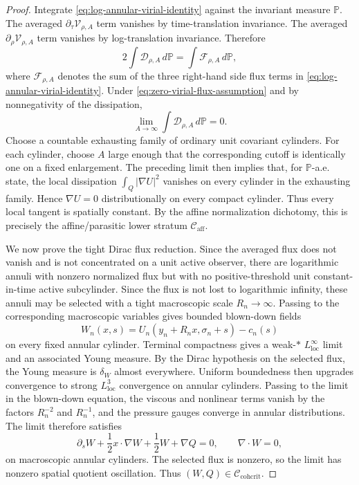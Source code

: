 \documentclass[11pt]{amsart}
\numberwithin{equation}{section}
\theoremstyle{plain}
\theoremstyle{definition}
\theoremstyle{remark}
\newcommand{\loc}{\mathrm{loc}}
\newcommand{\Caff}{\mathcal C_{\mathrm{aff}}}
\newcommand{\Ccohcrit}{\mathcal C_{\mathrm{cohcrit}}}
\begin{document}
\begin{proof}
Integrate \eqref{eq:log-annular-virial-identity} against the invariant measure
\(\mathbb P\).  The averaged \(\partial_\tau\mathcal V_{\rho,A}\) term
vanishes by time-translation invariance.  The averaged
\(\partial_\rho\mathcal V_{\rho,A}\) term vanishes by log-translation
invariance.  Therefore
\[
   2\int \mathcal D_{\rho,A}\,d\mathbb P
   =
   \int \mathcal F_{\rho,A}\,d\mathbb P,
\]
where \(\mathcal F_{\rho,A}\) denotes the sum of the three right-hand side flux
terms in \eqref{eq:log-annular-virial-identity}.  Under
\eqref{eq:zero-virial-flux-assumption} and by nonnegativity of the dissipation,
\[
   \lim_{A\to\infty}\int \mathcal D_{\rho,A}\,d\mathbb P=0 .
\]
Choose a countable exhausting family of ordinary unit covariant cylinders.  For
each cylinder, choose \(A\) large enough that the corresponding cutoff is
identically one on a fixed enlargement.  The preceding limit then implies that,
for \(\mathbb P\)-a.e. state, the local dissipation
\(\int_Q|\nabla U|^2\) vanishes on every cylinder in the exhausting family.
Hence \(\nabla U=0\) distributionally on every compact cylinder.  Thus every
local tangent is spatially constant.  By the affine normalization dichotomy,
this is precisely the affine/parasitic lower stratum \(\Caff\).

We now prove the tight Dirac flux reduction.  Since the averaged flux does not
vanish and is not concentrated on a unit active observer, there are logarithmic
annuli with nonzero normalized flux but with no positive-threshold unit
constant-in-time active subcylinder.  Since the flux is not lost to logarithmic
infinity, these annuli may be selected with a tight macroscopic scale
\(R_n\to\infty\).  Passing to the corresponding macroscopic variables gives
bounded blown-down fields
\[
   W_n(x,s)=U_n(y_n+R_nx,\sigma_n+s)-c_n(s)
\]
on every fixed annular cylinder.  Terminal compactness gives a
weak-\(*\) \(L^\infty_{\loc}\) limit and an associated Young measure.  By the
Dirac hypothesis on the selected flux, the Young measure is
\(\delta_W\) almost everywhere.  Uniform boundedness then upgrades convergence
to strong \(L^3_{\loc}\) convergence on annular cylinders.  Passing to the
limit in the blown-down equation, the viscous and nonlinear terms vanish by
the factors \(R_n^{-2}\) and \(R_n^{-1}\), and the pressure gauges converge in
annular distributions.  The limit therefore satisfies
\[
   \partial_s W+\frac12x\cdot\nabla W+\frac12W+\nabla Q=0,
   \qquad \nabla\cdot W=0,
\]
on macroscopic annular cylinders.  The selected flux is nonzero, so the limit
has nonzero spatial quotient oscillation.  Thus \((W,Q)\in\Ccohcrit\).
\end{proof}
\end{document}
